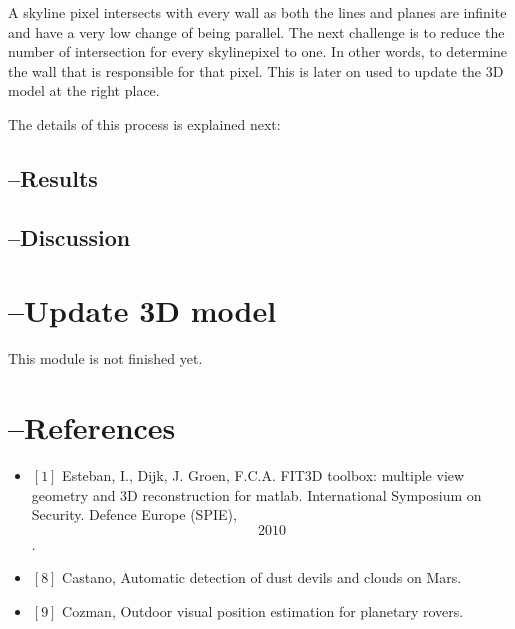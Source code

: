 A skyline pixel intersects with every wall as both the lines and planes are
infinite and have a very low change of being parallel.
The next challenge is to reduce the number of intersection for every skylinepixel
to one. In other words, to determine the wall that is responsible for that pixel. 
This is later on used to update the 3D model at the right place.

The details of this process is explained next:

\subsection{--Results}


\subsection{--Discussion}

\section{--Update 3D model}
This module is not finished yet.


\section{--References}
\begin{itemize}
\item $[1]$ 
Esteban, I., Dijk, J. Groen, F.C.A. FIT3D toolbox: multiple view geometry and
3D reconstruction for matlab. International Symposium on Security. Defence
Europe (SPIE), \[2010\].
\item $[8]$ Castano, Automatic detection of dust devils and clouds on Mars.
\item $[9]$ Cozman, Outdoor visual position estimation for planetary rovers.
\end{itemize}



%

